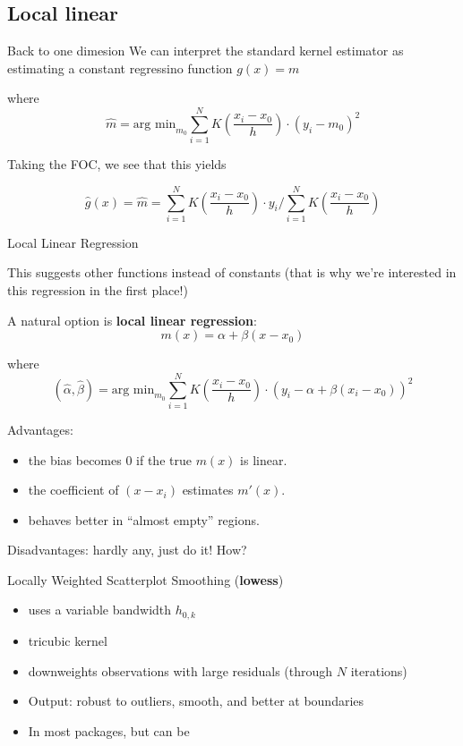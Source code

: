 \subsection{Local linear}
\begin{frame}[allowframebreaks]{Back to one dimesion}
We can interpret the standard kernel estimator as estimating a constant regressino function $g(x) = m$ 

where $$\hat m = \mbox{arg min}_{m_0} \sum_{i=1}^{N} K \left( \frac{x_i - x_0}{h} \right) \cdot \left( y_i - m_0 \right)^2 $$

Taking the FOC, we see that this yields 

$$\hat g(x) = \hat m = \sum_{i=1}^{N} K \left( \frac{x_i - x_0}{h} \right) \cdot y_i / \sum_{i=1}^{N} K \left( \frac{x_i - x_0}{h} \right) $$

\end{frame}

\begin{frame}[allowframebreaks]{Local Linear Regression}

This suggests other functions instead of constants (that is why we're interested in this regression in the first place!)

A natural option is \textbf{local linear regression}:
$$ m(x) = \alpha + \beta(x-x_0) $$ 

where $$(\hat \alpha, \hat \beta) = \mbox{arg min}_{m_0} \sum_{i=1}^{N} K \left( \frac{x_i - x_0}{h} \right) \cdot \left( y_i - \alpha + \beta(x_i-x_0) \right)^2 $$

\framebreak

Advantages:
\begin{itemize}
\item the bias becomes 0 if the true $m(x)$ is linear.
\item the coefficient of $(x-x_i)$ estimates $m'(x)$.
\item behaves better in ``almost empty'' regions.
\end{itemize}
{Disadvantages:} hardly any, just do it! How? 

\pause 

Locally Weighted Scatterplot Smoothing (\textbf{lowess})
\begin{itemize}
  \item uses a variable bandwidth $h_{0,k}$ 
  \item tricubic kernel 
  \item downweights observations with large residuals (through $N$ iterations)
  \item Output: robust to outliers, smooth, and better at boundaries
  \item In most packages, but can be 
\end{itemize}

\end{frame} 

